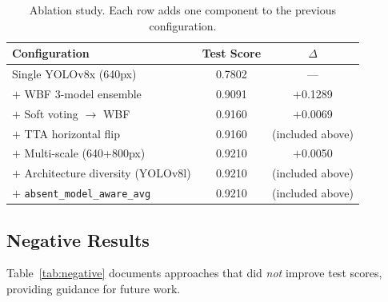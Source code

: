 \documentclass[11pt,a4paper]{article}
\begin{document}
\begin{table}[H]
\centering
\caption{Ablation study. Each row adds one component to the previous configuration.}
\label{tab:ablation}
\begin{tabular}{@{}lcc@{}}
\toprule
\textbf{Configuration} & \textbf{Test Score} & \textbf{$\Delta$} \\
\midrule
Single YOLOv8x (640px)                            & 0.7802 & --- \\
$+$ WBF 3-model ensemble                          & 0.9091 & $+$0.1289 \\
$+$ Soft voting $\to$ WBF                          & 0.9160 & $+$0.0069 \\
$+$ TTA horizontal flip                           & 0.9160 & (included above) \\
$+$ Multi-scale (640+800px)                        & 0.9210 & $+$0.0050 \\
$+$ Architecture diversity (YOLOv8l)               & 0.9210 & (included above) \\
$+$ \texttt{absent\_model\_aware\_avg}             & 0.9210 & (included above) \\
\bottomrule
\end{tabular}
\end{table}

\subsection{Negative Results}

Table~\ref{tab:negative} documents approaches that did \emph{not} improve test scores, providing guidance for future work.
\end{document}
